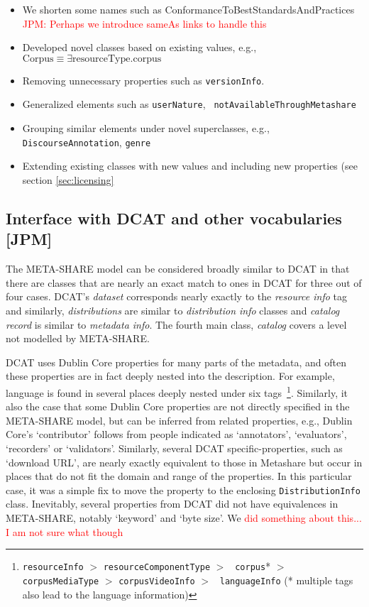 \documentclass{llncs}
\begin{document}
\begin{itemize}
    \item We shorten some names such as ConformanceToBestStandardsAndPractices
        \textcolor{red}{JPM: Perhaps we introduce sameAs links to handle this}
    \item Developed novel classes based on existing values, e.g.,
        $\mathrm{Corpus} \equiv \exists \mathrm{resourceType}.\mathrm{corpus}$
    \item Removing unnecessary properties such as {\tt versionInfo}.
    \item Generalized elements such as {\tt userNature}, {\tt
        notAvailableThroughMetashare}
    \item Grouping similar elements under novel superclasses, e.g., {\tt
        DiscourseAnnotation}, {\tt genre}
    \item Extending existing classes with new values and including new
        properties (see section \ref{sec:licensing}
\end{itemize}

\subsection{Interface with DCAT and other vocabularies [JPM]}
\label{sec:dcat}

The META-SHARE model can be considered broadly similar to DCAT in that there are
classes that are nearly an exact match to ones in DCAT for three out of four
cases. DCAT's \emph{dataset} corresponds nearly exactly to the \emph{resource
info} tag and similarly, \emph{distributions} are similar to \emph{distribution
info} classes and \emph{catalog record} is similar to \emph{metadata info}. The
fourth main class, \emph{catalog} covers a level not modelled by META-SHARE. 

DCAT uses Dublin Core properties for many parts of the metadata, and often these
properties are in fact deeply nested into the description. For example, language
is found in several places deeply nested under six
tags~\footnote{{\tt resourceInfo} $>$ {\tt resourceComponentType} $>$ {\tt
    corpus}* $>$ {\tt corpusMediaType} $>$ {\tt corpusVideoInfo} $>$ {\tt
languageInfo} (* multiple tags also lead to the language information)}.
Similarly, it also the case that some Dublin Core properties are not directly
specified in the META-SHARE model, but can be inferred from related properties,
e.g., Dublin Core's `contributor' follows from people indicated as `annotators',
`evaluators', `recorders' or `validators'. Similarly, several DCAT specific-properties, such as `download URL', are nearly
exactly equivalent to those in Metashare but occur in places that do not fit the
domain and range of the properties. In this particular case, it was a simple fix
to move the property to the enclosing {\tt DistributionInfo} class.
Inevitably, several properties from DCAT did not have equivalences in
META-SHARE, notably `keyword' and `byte size'. We \textcolor{red}{did something
about this... I am not sure what though}
\end{document}
